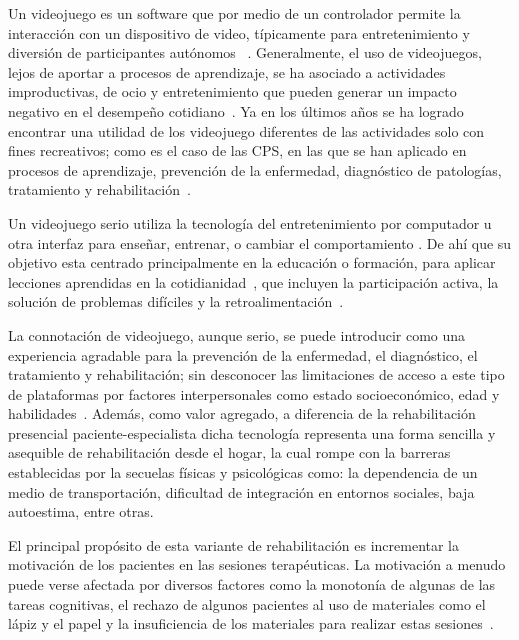 \begin{introduction}
    \vspace{5pt}
    Un videojuego es un software que por medio de un controlador permite la interacción con un dispositivo
    de video, típicamente para entretenimiento y diversión de participantes autónomos ~\cite{studenski2010interactive, gomez2012videojuegos, gonzalez2016mooc}. 
    Generalmente, el uso de videojuegos, 
    lejos de aportar a procesos de aprendizaje, se ha asociado a actividades improductivas, de ocio y entretenimiento que pueden 
    generar un impacto negativo en el desempeño cotidiano~\cite{maldonado2014videojuegos}. Ya en los últimos años se ha logrado encontrar una 
    utilidad de los videojuego diferentes de las actividades solo con fines recreativos; como es el caso de las CPS, en las 
    que se han aplicado en procesos de aprendizaje, prevención de la enfermedad, diagnóstico de patologías, 
    tratamiento y rehabilitación~\cite{ladino2021uso}. 

    \vspace{5pt}
    Un videojuego serio utiliza la tecnología del entretenimiento por computador u otra interfaz para enseñar, entrenar, o 
    cambiar el comportamiento . De ahí que su objetivo esta centrado principalmente en la educación o formación, para 
    aplicar lecciones aprendidas en la cotidianidad~\cite{graafland2014serious}, que incluyen la participación activa, la solución de problemas
    difíciles y la retroalimentación~\cite{gee2004learning}.
    
    \vspace{5pt}
    La connotación de videojuego, aunque serio, se puede introducir como una experiencia
    agradable para la prevención de la enfermedad, el diagnóstico, el tratamiento y rehabilitación;
    sin desconocer las limitaciones de acceso a este tipo de plataformas por factores interpersonales
    como estado socioeconómico, edad y habilidades~\cite{ladino2021uso}. Además, como valor agregado,
    a diferencia de la rehabilitación presencial paciente-especialista dicha tecnología representa una 
    forma sencilla y asequible de rehabilitación desde el hogar, la cual rompe con la barreras establecidas 
    por la secuelas físicas y psicológicas como: la dependencia de un medio de transportación, dificultad 
    de integración en entornos sociales, baja autoestima, entre otras.

    \vspace{5pt}
    El principal propósito de esta variante de rehabilitación es incrementar la 
    motivación de los pacientes en las sesiones terapéuticas. La motivación a menudo puede verse afectada 
    por diversos factores como la monotonía de algunas de las tareas cognitivas, el rechazo de algunos 
    pacientes al uso de materiales como el lápiz y el papel y la insuficiencia de los materiales para 
    realizar estas sesiones~\cite{regalon12019juegos}. 


\end{introduction}
